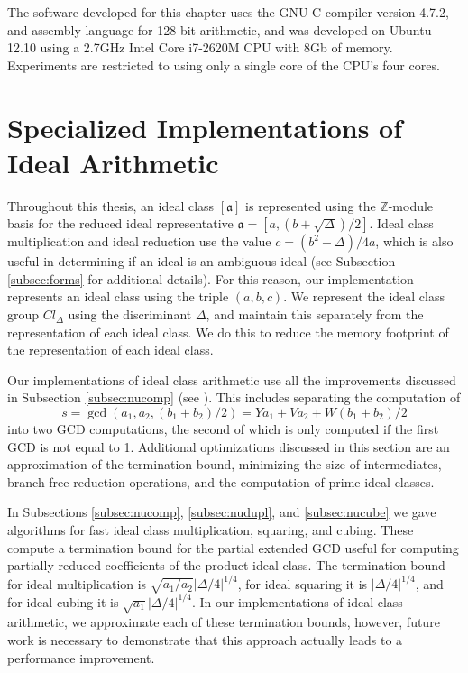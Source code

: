 \documentclass{ucalgthes1}
\theoremstyle{definition}
\newcommand{\ZZ}{\mathbb{Z}}
\newcommand{\compiler}{GNU C compiler version 4.7.2}
\newcommand{\cpu}{2.7GHz Intel Core i7-2620M CPU}
\begin{document}
The software developed for this chapter uses the \compiler{}, and assembly language for 128 bit arithmetic, and was developed on Ubuntu 12.10 using a \cpu{} with 8Gb of memory.  Experiments are restricted to using only a single core of the CPU's four cores.

\section{Specialized Implementations of Ideal Arithmetic}
\label{sec:implementationOfIdealArithmetic}


Throughout this thesis, an ideal class $[\mathfrak a]$ is represented using the $\ZZ$-module basis for the reduced ideal representative $\mathfrak a = [a, (b + \sqrt{\Delta})/2]$.  Ideal class multiplication and ideal reduction use the value $c = (b^2 - \Delta)/4a$, which is also useful in determining if an ideal is an ambiguous ideal (see Subsection \ref{subsec:forms} for additional details).  For this reason, our implementation represents an ideal class using the triple $(a, b, c)$.  We represent the ideal class group $Cl_\Delta$ using the discriminant $\Delta$, and maintain this separately from the representation of each ideal class.  We do this to reduce the memory footprint of the representation of each ideal class.

Our implementations of ideal class arithmetic use all the improvements discussed in Subsection \ref{subsec:nucomp} (see \cite[Algorithm~6]{Imbert2010}).  This includes separating the computation of
\[
s = \gcd(a_1, a_2, (b_1+b_2)/2) = Ya_1 + Va_2 + W(b_1+b_2)/2
\]
into two GCD computations, the second of which is only computed if the first GCD is not equal to 1.  Additional optimizations discussed in this section are an approximation of the termination bound, minimizing the size of intermediates, branch free reduction operations, and the computation of prime ideal classes.

In Subsections \ref{subsec:nucomp}, \ref{subsec:nudupl}, and \ref{subsec:nucube} we gave algorithms for fast ideal class multiplication, squaring, and cubing.  These compute a termination bound for the partial extended GCD useful for computing partially reduced coefficients of the product ideal class.  The termination bound for ideal multiplication is $\sqrt{a_1/a_2}|\Delta/4|^{1/4}$, for ideal squaring it is $|\Delta/4|^{1/4}$, and for ideal cubing it is $\sqrt{a_1}|\Delta/4|^{1/4}$.  In our implementations of ideal class arithmetic, we approximate each of these termination bounds, however, future work is necessary to demonstrate that this approach actually leads to a performance improvement.
\end{document}
